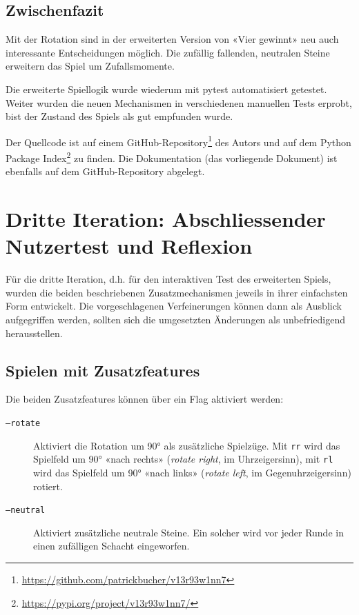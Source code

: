 \documentclass[a4paper,11pt,hidelinks]{scrartcl}
\begin{document}
\subsection{Zwischenfazit}

Mit der Rotation sind in der erweiterten Version von «Vier gewinnt» neu auch interessante Entscheidungen möglich. Die zufällig fallenden, neutralen Steine erweitern das Spiel um Zufallsmomente.

Die erweiterte Spiellogik wurde wiederum mit pytest automatisiert getestet. Weiter wurden die neuen Mechanismen in verschiedenen manuellen Tests erprobt, bist der Zustand des Spiels als gut empfunden wurde.

Der Quellcode ist auf einem GitHub-Repository\footnote{\url{https://github.com/patrickbucher/v13r93w1nn7}} des Autors und auf dem Python Package Index\footnote{\url{https://pypi.org/project/v13r93w1nn7/}} zu finden. Die Dokumentation (das vorliegende Dokument) ist ebenfalls auf dem GitHub-Repository abgelegt.

\clearpage

\section{Dritte Iteration: Abschliessender Nutzertest und Reflexion}

Für die dritte Iteration, d.h. für den interaktiven Test des erweiterten Spiels, wurden die beiden beschriebenen Zusatzmechanismen jeweils in ihrer einfachsten Form entwickelt. Die vorgeschlagenen Verfeinerungen können dann als Ausblick aufgegriffen werden, sollten sich die umgesetzten Änderungen als unbefriedigend herausstellen.

\subsection{Spielen mit Zusatzfeatures}

Die beiden Zusatzfeatures können über ein Flag aktiviert werden:

\begin{description}
    \item[\texttt{--rotate}] Aktiviert die Rotation um 90° als zusätzliche Spielzüge. Mit \texttt{rr} wird das Spielfeld um 90° «nach rechts» (\textit{rotate right}, im Uhrzeigersinn), mit \texttt{rl} wird das Spielfeld um 90° «nach links» (\textit{rotate left}, im Gegenuhrzeigersinn) rotiert.
    \item[\texttt{--neutral}] Aktiviert zusätzliche neutrale Steine. Ein solcher wird vor jeder Runde in einen zufälligen Schacht eingeworfen.
\end{description}
\end{document}
